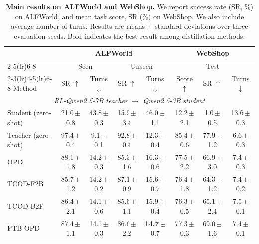 \begin{table}[!t]
\centering
\caption{\textbf{Main results on ALFWorld and WebShop.} We report success rate (SR, \%) on ALFWorld, and mean task score, SR (\%) on WebShop. We also include average number of turns. Results are means $\pm$ standard deviations over three evaluation seeds. Bold indicates the best result among distillation methods.}
\label{tab:exp-agentic}
\small
\setlength{\tabcolsep}{3pt}
\renewcommand{\arraystretch}{1.12}
\begin{tabular*}{\textwidth}{@{\extracolsep{\fill}}l cccc ccc@{}}
\toprule
& \multicolumn{4}{c}{\textbf{ALFWorld}} & \multicolumn{3}{c}{\textbf{WebShop}} \\
\cmidrule(lr){2-5}\cmidrule(lr){6-8}
& \multicolumn{2}{c}{Seen} & \multicolumn{2}{c}{Unseen} & \multicolumn{3}{c}{Test} \\
\cmidrule(lr){2-3}\cmidrule(lr){4-5}\cmidrule(lr){6-8}
Method & SR $\uparrow$ & Turns $\downarrow$ & SR $\uparrow$ & Turns $\downarrow$ & Score $\uparrow$ & SR $\uparrow$ & Turns $\downarrow$ \\
\midrule
\multicolumn{8}{c}{\textit{RL-Qwen2.5-7B teacher $\rightarrow$ Qwen2.5-3B student}} \\
\addlinespace[2pt]
Student (zero-shot) & 21.0\,\scriptsize{$\pm$0.8} & 43.8\,\scriptsize{$\pm$0.3} & 15.9\,\scriptsize{$\pm$3.4} & 46.0\,\scriptsize{$\pm$1.1} & 12.2\,\scriptsize{$\pm$2.1} & 1.0\,\scriptsize{$\pm$0.5} & 13.6\,\scriptsize{$\pm$0.3} \\
Teacher (zero-shot) & 97.4\,\scriptsize{$\pm$0.4} & 9.1\,\scriptsize{$\pm$0.1} & 92.8\,\scriptsize{$\pm$0.4} & 12.3\,\scriptsize{$\pm$0.4} & 85.4\,\scriptsize{$\pm$0.6} & 77.9\,\scriptsize{$\pm$1.2} & 6.6\,\scriptsize{$\pm$0.3} \\
\midrule
OPD & 88.1\,\scriptsize{$\pm$1.8} & 14.2\,\scriptsize{$\pm$0.3} & 85.3\,\scriptsize{$\pm$1.6} & 16.3\,\scriptsize{$\pm$0.6} & 77.5\,\scriptsize{$\pm$2.2} & 66.9\,\scriptsize{$\pm$3.0} & 7.4\,\scriptsize{$\pm$0.3} \\
TCOD-F2B & 85.7\,\scriptsize{$\pm$1.2} & 14.2\,\scriptsize{$\pm$0.2} & 87.1\,\scriptsize{$\pm$0.9} & 15.6\,\scriptsize{$\pm$0.7} & 76.4\,\scriptsize{$\pm$1.8} & 64.3\,\scriptsize{$\pm$1.2} & 7.4\,\scriptsize{$\pm$0.2} \\
TCOD-B2F & 86.4\,\scriptsize{$\pm$2.1} & 14.1\,\scriptsize{$\pm$0.6} & 85.6\,\scriptsize{$\pm$1.1} & 15.9\,\scriptsize{$\pm$0.4} & 76.3\,\scriptsize{$\pm$0.5} & 65.1\,\scriptsize{$\pm$2.4} & 7.5\,\scriptsize{$\pm$0.1} \\
FTB-OPD & 87.4\,\scriptsize{$\pm$1.1} & 14.1\,\scriptsize{$\pm$0.3} & 86.6\,\scriptsize{$\pm$2.2} & \textbf{14.7}\,\scriptsize{$\pm$0.7} & 77.3\,\scriptsize{$\pm$0.3} & 69.0\,\scriptsize{$\pm$1.6} & 7.4\,\scriptsize{$\pm$0.1} \\

\end{tabular*}
\end{table}
